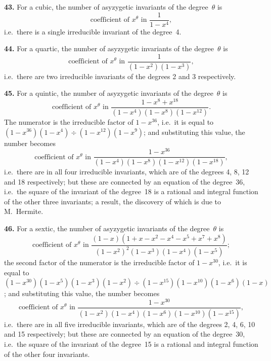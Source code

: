 \documentclass[11pt]{article}
\begin{document}
\textbf{43.} For a cubic, the number of asyzygetic invariants of the degree~$\theta$ is
\[
\text{coefficient of } x^\theta \text{ in } \frac{1}{1-x^4},
\]
i.e.\ there is a single irreducible invariant of the degree~4.

\textbf{44.} For a quartic, the number of asyzygetic invariants of the degree~$\theta$ is
\[
\text{coefficient of } x^\theta \text{ in } \frac{1}{(1-x^2)(1-x^3)},
\]
i.e.\ there are two irreducible invariants of the degrees 2 and 3 respectively.

\textbf{45.} For a quintic, the number of asyzygetic invariants of the degree~$\theta$ is
\[
\text{coefficient of } x^\theta \text{ in } \frac{1 - x^8 + x^{18}}{(1-x^4)(1-x^8)(1-x^{12})}.
\]
The numerator is the irreducible factor of $1-x^{36}$, i.e.\ it is equal to $(1-x^{36})(1-x^4)\div(1-x^{12})(1-x^{9})$; and substituting this value, the number becomes
\[
\text{coefficient of } x^\theta \text{ in } \frac{1-x^{36}}{(1-x^4)(1-x^8)(1-x^{12})(1-x^{18})},
\]
i.e.\ there are in all four irreducible invariants, which are of the degrees 4, 8, 12 and 18 respectively; but these are connected by an equation of the degree~36, i.e.\ the square of the invariant of the degree~18 is a rational and integral function of the other three invariants; a result, the discovery of which is due to M.\ Hermite.

\textbf{46.} For a sextic, the number of asyzygetic invariants of the degree~$\theta$ is
\[
\text{coefficient of } x^\theta \text{ in } \frac{(1-x)(1+x-x^2-x^4-x^5+x^7+x^8)}{(1-x^2)^2(1-x^3)(1-x^4)(1-x^5)};
\]
the second factor of the numerator is the irreducible factor of $1-x^{30}$, i.e.\ it is equal to $(1-x^{30})(1-x^5)(1-x^3)(1-x^2)\div(1-x^{15})(1-x^{10})(1-x^6)(1-x)$; and substituting this value, the number becomes
\[
\text{coefficient of } x^\theta \text{ in } \frac{1-x^{30}}{(1-x^2)(1-x^4)(1-x^6)(1-x^{10})(1-x^{15})},
\]
i.e.\ there are in all five irreducible invariants, which are of the degrees 2, 4, 6, 10 and 15 respectively; but these are connected by an equation of the degree~30, i.e.\ the square of the invariant of the degree~15 is a rational and integral function of the other four invariants.
\end{document}
